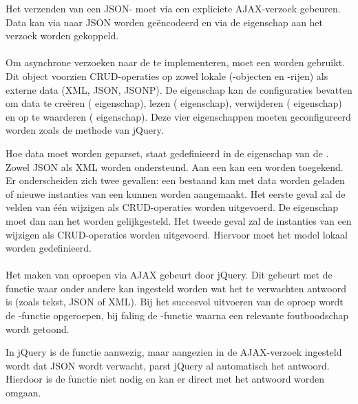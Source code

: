 Het verzenden van een JSON- moet via een expliciete AJAX-verzoek gebeuren.
Data kan via  naar JSON worden geëncodeerd en via de  eigenschap aan het verzoek worden gekoppeld.

\paragraph{\kendo}
Om asynchrone verzoeken naar de  te implementeren, moet een  worden gebruikt.
Dit object voorzien CRUD-operaties op zowel lokale (\js-objecten en \js-rijen) als externe data (XML, JSON, JSONP).
De  eigenschap kan de configuraties bevatten om data te creëren ( eigenschap),  lezen ( eigenschap),  verwijderen ( eigenschap) en op te waarderen ( eigenschap).
Deze vier eigenschappen moeten geconfigureerd worden zoals de  methode van jQuery.

Hoe data moet worden geparset, staat gedefinieerd in de  eigenschap van de .
Zowel JSON als XML worden ondersteund.
Aan een  kan een  worden toegekend.
Er onderscheiden zich twee gevallen:  een bestaand  kan met data worden geladen of nieuwe instanties van een  kunnen worden aangemaakt.
Het eerste geval zal de velden van één  wijzigen als CRUD-operaties worden uitgevoerd.
De eigenschap moet dan aan het  worden gelijkgesteld.
Het tweede geval zal de instanties van een  wijzigen als CRUD-operaties worden uitgevoerd.
Hiervoor moet het model lokaal worden gedefinieerd.

\paragraph{\jqm}
Het maken van oproepen via AJAX gebeurt door jQuery. 
Dit gebeurt met de functie  waar onder andere kan ingesteld worden wat het te verwachten antwoord is (zoals tekst, JSON of XML). 
Bij het succesvol uitvoeren van de oproep wordt de -functie opgeroepen, bij faling de -functie waarna een relevante foutboodschap wordt getoond.

In jQuery is de functie  aanwezig, maar aangezien in de AJAX-verzoek ingesteld wordt dat JSON wordt verwacht, parst jQuery al automatisch het antwoord. 
Hierdoor is de functie  niet nodig en kan er direct met het antwoord worden omgaan.

